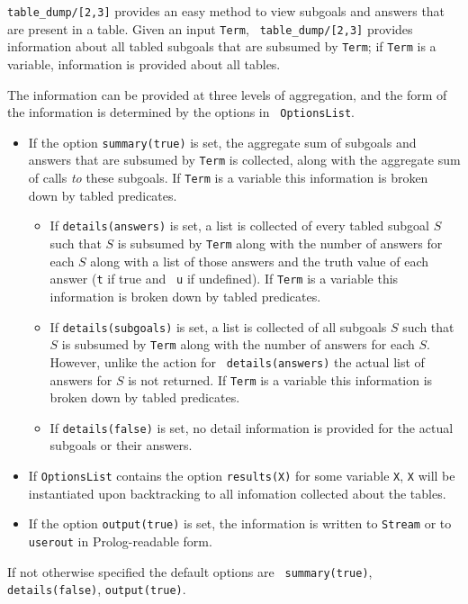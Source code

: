 \begin{description}
%
%
{\tt table\_dump/[2,3]} provides an easy method to view subgoals and
answers that are present in a table.  Given an input {\tt Term}, {\tt
  table\_dump/[2,3]} provides information about all tabled subgoals
that are subsumed by {\tt Term}; if {\tt Term} is a variable,
information is provided about all tables.

The information can be provided at three levels of aggregation, and
the form of the information is determined by the options in {\tt
  OptionsList}.
%
\begin{itemize}
\item If the option {\tt summary(true)} is set, the aggregate sum
  of subgoals and answers that are subsumed by {\tt Term} is
  collected, along with the aggregate sum of calls {\it to} these
  subgoals.  If {\tt Term} is a variable this information is broken
  down by tabled predicates.
%
\begin{itemize}
\item If {\tt details(answers)} is set, a list is collected of every
  tabled subgoal $S$ such that $S$ is subsumed by {\tt Term} along
  with the number of answers for each $S$ along with a list of those
  answers and the truth value of each answer ({\tt t} if true and {\tt
    u} if undefined).  If {\tt Term} is a variable this information is
  broken down by tabled predicates.
%
\item If {\tt details(subgoals)} is set, a list is collected of all
  subgoals $S$ such that $S$ is subsumed by {\tt Term} along with the
  number of answers for each $S$.  However, unlike the action for {\tt
    details(answers)} the actual list of answers for $S$ is not
  returned.  If {\tt Term} is a variable this information is broken
  down by tabled predicates.
%
\item If {\tt details(false)} is set, no detail information is
  provided for the actual subgoals or their answers.
\end{itemize}
%
\item If {\tt OptionsList} contains the option {\tt results(X)} for
  some variable {\tt X}, {\tt X} will be instantiated upon
  backtracking to all infomation collected about the tables.
%
\item If the option {\tt output(true)} is set, the information is
  written to {\tt Stream} or to {\tt userout} in Prolog-readable form.
\end{itemize}
%
If not otherwise specified the default options are {\tt
  summary(true)}, {\tt details(false)}, {\tt output(true)}.


\end{description}
